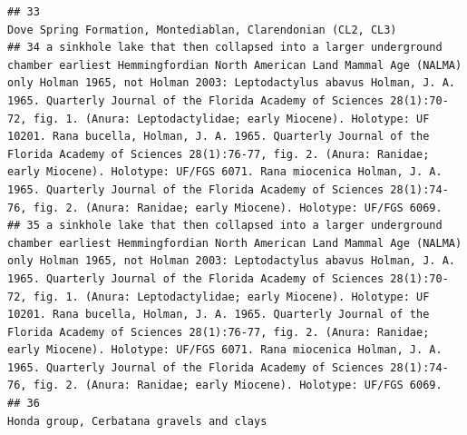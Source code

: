 \documentclass[]{article}
\begin{document}
\begin{verbatim}
## 33                                                                                                                                                                                                                                                                                                                                                                                                                                                                                                                                                                                                                                     Dove Spring Formation, Montediablan, Clarendonian (CL2, CL3)
## 34 a sinkhole lake that then collapsed into a larger underground chamber earliest Hemmingfordian North American Land Mammal Age (NALMA) only Holman 1965, not Holman 2003: Leptodactylus abavus Holman, J. A. 1965. Quarterly Journal of the Florida Academy of Sciences 28(1):70-72, fig. 1. (Anura: Leptodactylidae; early Miocene). Holotype: UF 10201. Rana bucella, Holman, J. A. 1965. Quarterly Journal of the Florida Academy of Sciences 28(1):76-77, fig. 2. (Anura: Ranidae; early Miocene). Holotype: UF/FGS 6071. Rana miocenica Holman, J. A. 1965. Quarterly Journal of the Florida Academy of Sciences 28(1):74-76, fig. 2. (Anura: Ranidae; early Miocene). Holotype: UF/FGS 6069.
## 35 a sinkhole lake that then collapsed into a larger underground chamber earliest Hemmingfordian North American Land Mammal Age (NALMA) only Holman 1965, not Holman 2003: Leptodactylus abavus Holman, J. A. 1965. Quarterly Journal of the Florida Academy of Sciences 28(1):70-72, fig. 1. (Anura: Leptodactylidae; early Miocene). Holotype: UF 10201. Rana bucella, Holman, J. A. 1965. Quarterly Journal of the Florida Academy of Sciences 28(1):76-77, fig. 2. (Anura: Ranidae; early Miocene). Holotype: UF/FGS 6071. Rana miocenica Holman, J. A. 1965. Quarterly Journal of the Florida Academy of Sciences 28(1):74-76, fig. 2. (Anura: Ranidae; early Miocene). Holotype: UF/FGS 6069.
## 36                                                                                                                                                                                                                                                                                                                                                                                                                                                                                                                                                                                                                                                         Honda group, Cerbatana gravels and clays

\end{verbatim}
\end{document}
